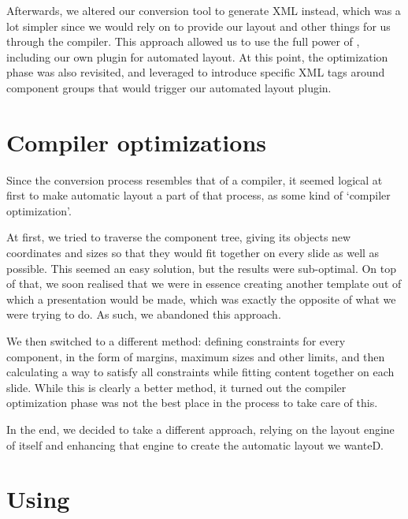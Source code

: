    Afterwards, we altered our conversion tool to generate \mxp XML instead,
   which was a lot simpler since we would rely on \mxp to provide our layout
   and other things for us through the \mxp compiler. This approach allowed us
   to use the full power of \mxp, including our own plugin for automated
   layout. At this point, the optimization phase was also revisited, and
   leveraged to introduce specific XML tags around component groups that would
   trigger our automated layout plugin.

  \section{Compiler optimizations}
   \label{compiler-optimizations}

   Since the conversion process resembles that of a compiler, it seemed logical
   at first to make automatic layout a part of that process, as some kind of
   `compiler optimization'.

   At first, we tried to traverse the component tree, giving its objects new
   coordinates and sizes so that they would fit together on every slide as well
   as possible. This seemed an easy solution, but the results were sub-optimal.
   On top of that, we soon realised that we were in essence creating another
   template out of which a presentation would be made, which was exactly the
   opposite of what we were trying to do. As such, we abandoned this approach.

   We then switched to a different method: defining constraints for every
   component, in the form of margins, maximum sizes and other limits, and then
   calculating a way to satisfy all constraints while fitting content together
   on each slide. While this is clearly a better method, it turned out the
   compiler optimization phase was not the best place in the process to take
   care of this.

   In the end, we decided to take a different approach, relying on the layout
   engine of \mxp itself and enhancing that engine to create the automatic
   layout we wanteD.

  \section{Using \mxp}
   \label{mxp-plugin}

